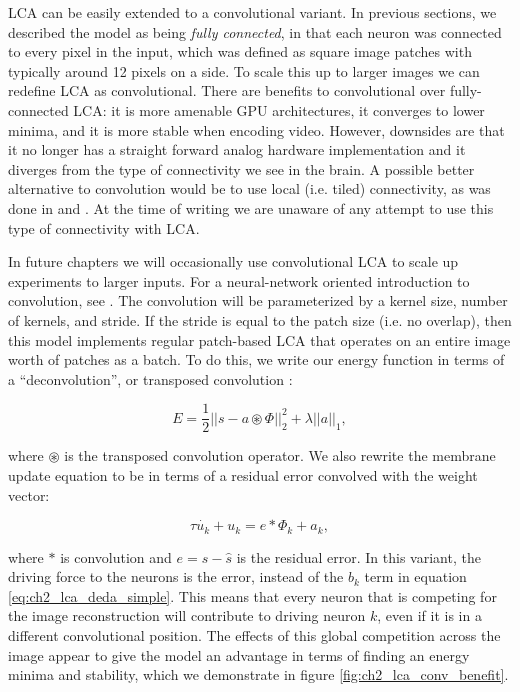 LCA can be easily extended to a convolutional variant. In previous sections, we described the model as being \textit{fully connected}, in that each neuron was connected to every pixel in the input, which was defined as square image patches with typically around 12 pixels on a side. To scale this up to larger images we can redefine LCA as convolutional. There are benefits to convolutional over fully-connected LCA: it is more amenable GPU architectures, it converges to lower minima, and it is more stable when encoding video. However, downsides are that it no longer has a straight forward analog hardware implementation and it diverges from the type of connectivity we see in the brain. A possible better alternative to convolution would be to use local (i.e. tiled) connectivity, as was done in \parencite{le2011building} and \parencite{ngiam2010tiled}. At the time of writing we are unaware of any attempt to use this type of connectivity with LCA.

In future chapters we will occasionally use convolutional LCA to scale up experiments to larger inputs. For a neural-network oriented introduction to convolution, see \parencite{goodfellow2019deep}. The convolution will be parameterized by a kernel size, number of kernels, and stride. If the stride is equal to the patch size (i.e. no overlap), then this model implements regular patch-based LCA that operates on an entire image worth of patches as a batch. To do this, we write our energy function in terms of a ``deconvolution'', or transposed convolution \cite{zeiler2010deconvolutional}:

\begin{equation}
    E = \frac{1}{2} || s - a \circledast \Phi ||^{2}_{2} + \lambda ||a||_{1},
\end{equation}

\noindent where $\circledast$ is the transposed convolution operator. We also rewrite the membrane update equation to be in terms of a residual error convolved with the weight vector:

\begin{equation}\label{eq:ch2_conv_lca_dynamics}
   \tau \dot{u_{k}} + u_{k} = e \ast \Phi_{k} + a_{k},
\end{equation}

\noindent where $\ast$ is convolution and $e = s - \hat{s}$ is the residual error. In this variant, the driving force to the neurons is the error, instead of the $b_{k}$ term in equation \ref{eq:ch2_lca_deda_simple}. This means that every neuron that is competing for the image reconstruction will contribute to driving neuron $k$, even if it is in a different convolutional position. The effects of this global competition across the image appear to give the model an advantage in terms of finding an energy minima and stability, which we demonstrate in figure \ref{fig:ch2_lca_conv_benefit}.


